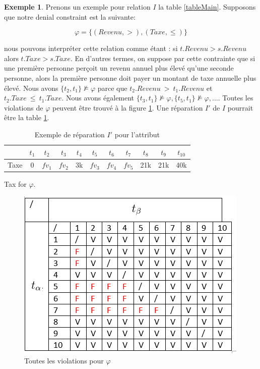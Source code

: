 \documentclass[letterpaper, 12pt]{report}
\theoremstyle{definition}
\newtheorem{myexample}{Exemple}
\begin{document}
\begin{myexample}
Prenons un exemple pour relation $I$ la table \ref{tableMain}. Supposons que notre denial constraint est la suivante:

$$ \varphi = \{(Revenu,>),(Taxe,\leq)\}$$

nous pouvons interpréter cette relation comme étant : si $t.Revenu > s.Revenu$ alors $t.Taxe > s.Taxe$. En d'autres termes, on suppose par cette contrainte que si une première personne perçoit un revenu annuel plus élevé qu'une seconde personne, alors la première personne doit payer un montant de taxe annuelle plus élevé. Nous avons $\{t_2,t_1\} \not\models \varphi$ parce que $t_2.Revenu\ >\ t_1.Revenu$ et $t_2.Taxe\ \leq\ t_1.Taxe$. Nous avons également $\{t_3,t_1\} \not\models \varphi,\{t_5,t_1\} \not\models \varphi,...$. Toutes les violations de $\varphi$ peuvent être trouvé à la figure \ref{BadTax}. Une réparation $I'$ de $I$ pourrait être la table \ref{tableExample}.


\begin{table}[H]
	\centering
	\begin{tabular}{|c|c c c c c c c c c c|}
	\hline
	   & $t_1$ & $t_2$ & $t_3$ &$t_4$ &$t_5$ &$t_6$ &$t_7$ &$t_8$ &$t_9$ &$t_{10}$ \\
	\hline
	 Taxe & 0 & \color{red} $fv_1$ & \color{red} $fv_2$& 3k & \color{orange}$fv_3$& \color{orange} $fv_4$& \color{orange} $fv_5$& 21k & 21k & 40k\\
	 \hline
	\end{tabular}
	\caption{\label{tableExample} Exemple de réparation $I'$ pour l'attribut} 
	Tax for $\varphi$.
\end{table}


\begin{figure}
	\centering
	\includegraphics[scale=1]{img/TaxBad}
	\caption{\label{BadTax} Toutes les violations pour $\varphi$}
\end{figure}


\end{myexample}
\end{document}

